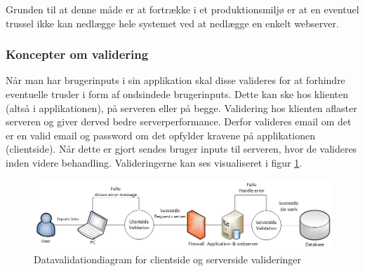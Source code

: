 \documentclass[Arkitektur/System_main.tex]{subfiles}
\begin{document}
Grunden til at denne måde er at fortrække i et produktionsmiljø er at en eventuel trussel ikke kan nedlægge hele systemet ved at nedlægge en enkelt webserver.

\subsubsection{Koncepter om validering}
Når man har brugerinputs i sin applikation skal disse valideres for at forhindre eventuelle trusler i form af ondsindede brugerinputs. Dette kan ske hos klienten (altså i applikationen), på serveren eller på begge. Validering hos klienten aflaster serveren og giver derved bedre serverperformance. Derfor valideres email om det er en valid email og password om det opfylder kravene på applikationen (clientside). Når dette er gjort sendes bruger inputs til serveren, hvor de valideres inden videre behandling. Valideringerne kan ses visualiseret i figur \ref{fig:datavalidation_diagram}.

\begin{figure}[H]
    \centering
    \includegraphics[width=\textwidth]{Arkitektur/graphics/DataValidationDiagram.png}
    \caption{Datavalidationdiagram for clientside og serverside valideringer}
    \label{fig:datavalidation_diagram}
\end{figure}
\end{document}
